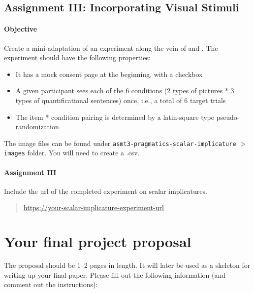 \documentclass{article}
\begin{document}
\subsection{Assignment III: Incorporating Visual Stimuli}\label{asmt3}

\paragraph{Objective} Create a mini-adaptation of an experiment along the vein of \cite{barner2011} and \cite{jasbi2017}. The experiment should have the following properties:

\begin{itemize}
    \item It has a mock consent page at the beginning, with a checkbox
    \item A given participant sees each of the 6 conditions (2 types of pictures * 3 types of quantificational sentences) once, i.e., a total of 6 target trials 
    \item The item * condition pairing is determined by a latin-square type pseudo-randomization
\end{itemize}

\noindent The image files can be found under \texttt{asmt3-pragmatics-scalar-implicature} $>$ \texttt{images} folder. You will need to create a .csv.

\paragraph{Assignment III}

Include the url of the completed experiment on scalar implicatures.\ 


\begin{quotation}
\noindent
\url{https://your-scalar-implicature-experiment-url}
\end{quotation}



\section{Your final project proposal}

The proposal should be 1--2 pages in length. It will later be used as a skeleton for writing up your final paper. 
Please fill out the following information (and comment out the instructions):
\end{document}
